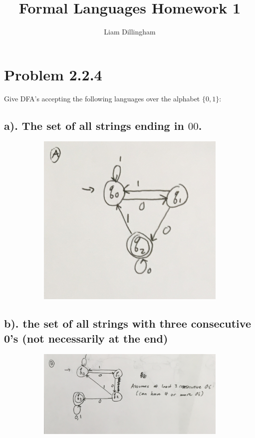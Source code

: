 \documentclass[20pt]{article} %
\title{Formal Languages Homework 1}
\author{Liam Dillingham}
\begin{document}
\maketitle

\section{Problem 2.2.4}
Give DFA's accepting the following languages over the alphabet $\{0,1\}$:
\subsection{a). The set of all strings ending in $00$.}
\begin{figure}[!htbp]
  	\centering
   	\begin{subfigure}[p]{0.5\linewidth}
    	\includegraphics[width=\linewidth]{./figures/H1a.png}
   	\end{subfigure}
\end{figure} 
\newpage
\subsection{b). the set of all strings with three consecutive 0's (not necessarily at the end)}
\begin{figure}[!htbp]
  	\centering
   	\begin{subfigure}[p]{1.1\linewidth}
    	\includegraphics[width=\linewidth]{./figures/H1b.png}
   	\end{subfigure}
\end{figure} 
\end{document}
